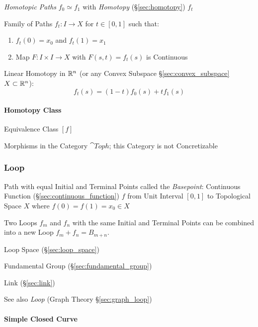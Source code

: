 \emph{Homotopic Paths} $f_0 \simeq f_1$ with \emph{Homotopy}
(\S\ref{sec:homotopy}) $f_t$

Family of Paths $f_t : I \rightarrow X$ for $t \in [0,1]$ such that:
\begin{enumerate}
  \item $f_t(0) = x_0$ and $f_t(1) = x_1$
  \item Map $F : I \times I \rightarrow X$ with $F(s,t) = f_t(s)$ is
    Continuous
\end{enumerate}

Linear Homotopy in $\mathbb{R}^n$ (or any Convex Subspace
\S\ref{sec:convex_subspace} $X \subset \mathbb{R}^n$):
\[
  f_t(s) = (1 - t) f_0(s) + t f_1(s)
\]



\paragraph{Homotopy Class}\label{sec:homotopy_class}\hfill

Equivalence Class $[f]$

Morphisms in the Category $\cat{Toph}$; this Category is not
Concretizable



\subsubsection{Loop}\label{sec:loop}

Path with equal Initial and Terminal Points called the
\emph{Basepoint}: Continuous Function
(\S\ref{sec:continuous_function}) $f$ from Unit Interval $[0,1]$ to
Topological Space $X$ where $f(0) = f(1) = x_0 \in X$

Two Loops $f_m$ and $f_n$ with the same Initial and Terminal Points
can be combined into a new Loop $f_m + f_n = B_{m+n}$.
\cite{hatcher02}

Loop Space (\S\ref{sec:loop_space})

Fundamental Group (\S\ref{sec:fundamental_group})

Link (\S\ref{sec:link})

\fist See also \emph{Loop} (Graph Theory \S\ref{sec:graph_loop})



\paragraph{Simple Closed Curve}\label{sec:simple_closed_curve}\hfill

